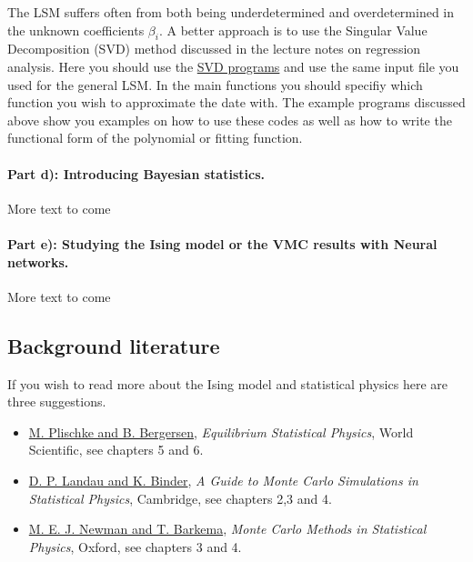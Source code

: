 \documentclass[%
oneside,                 %
final,                   %
10pt]{article}
\begin{document}
The LSM suffers often from both being underdetermined and overdetermined in the unknown coefficients $\beta_i$.  A better approach is to use the Singular Value Decomposition (SVD) method discussed in the lecture notes on regression analysis. Here you should use the \href{{https://github.com/CompPhysics/MachineLearning/tree/master/doc/Programs/SVD}}{SVD programs} and use the same input file you used for the general LSM. In the main functions you should specifiy which function you wish to approximate the date with. The example programs discussed above show you examples on how to use these codes as well as how to write the functional form of the polynomial or fitting function. 


\paragraph{Part d): Introducing Bayesian statistics.}
More text to come

\paragraph{Part e): Studying the Ising model or the VMC results with Neural networks.}
More text to come

\subsection{Background literature}

If you wish to read more about the Ising model and statistical physics here are three suggestions.

\begin{itemize}
  \item \href{{http://www.worldscientific.com/worldscibooks/10.1142/5660}}{M. Plischke and B. Bergersen}, \emph{Equilibrium Statistical Physics}, World Scientific, see chapters 5 and 6.

  \item \href{{http://www.cambridge.org/no/academic/subjects/physics/computational-science-and-modelling/guide-monte-carlo-simulations-statistical-physics-4th-edition?format=HB}}{D. P. Landau and K. Binder}, \emph{A Guide to Monte Carlo Simulations in Statistical Physics}, Cambridge, see chapters 2,3 and 4.

  \item \href{{https://global.oup.com/academic/product/monte-carlo-methods-in-statistical-physics-9780198517979?cc=no&lang=en&}}{M. E. J. Newman and T. Barkema}, \emph{Monte Carlo Methods in Statistical Physics}, Oxford, see chapters 3 and 4.
\end{itemize}
\end{document}
